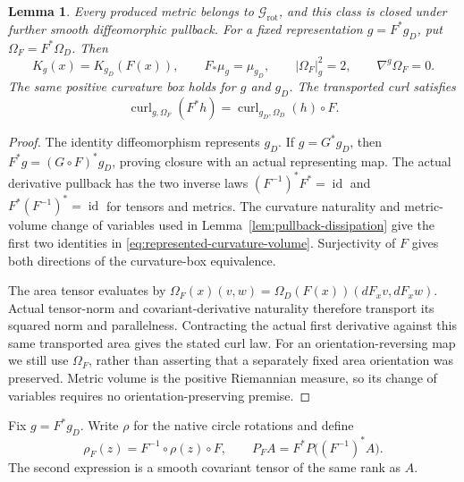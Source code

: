 \documentclass[11pt]{article}
\newtheorem{lemma}[theorem]{Lemma}
\begin{document}
\begin{lemma}\label{lem:represented-metric-naturality}
Every produced metric belongs to $\mathcal G_{\mathrm{rot}}$, and this
class is closed under further smooth diffeomorphic pullback.
For a fixed representation $g=F^*g_D$, put $\Omega_F=F^*\Omega_D$. Then
\begin{equation}\label{eq:represented-curvature-volume}
 K_g(x)=K_{g_D}(F(x)),\qquad
 F_*\mu_g=\mu_{g_D},\qquad
 |\Omega_F|_g^2=2,\qquad \nabla^g\Omega_F=0 .
\end{equation}
The same positive curvature box holds for $g$ and $g_D$. The transported
curl satisfies
\[
 \operatorname{curl}_{g,\Omega_F}(F^*h)
 =\operatorname{curl}_{g_D,\Omega_D}(h)\circ F.
\]
\end{lemma}

\begin{proof}
The identity diffeomorphism represents $g_D$. If $g=G^*g_D$, then
$F^*g=(G\circ F)^*g_D$, proving closure with an actual representing map.
The actual derivative pullback has the two inverse laws
$(F^{-1})^*F^*=\operatorname{id}$ and
$F^*(F^{-1})^*=\operatorname{id}$ for tensors and metrics.
The curvature naturality and metric-volume change of variables used in
Lemma~\ref{lem:pullback-dissipation} give the first two identities in
\eqref{eq:represented-curvature-volume}. Surjectivity of $F$ gives both
directions of the curvature-box equivalence.

The area tensor evaluates by
$\Omega_F(x)(v,w)=\Omega_D(F(x))(dF_xv,dF_xw)$.
Actual tensor-norm and covariant-derivative naturality therefore transport
its squared norm and parallelness. Contracting the actual first derivative
against this same transported area gives the stated curl law.
For an orientation-reversing map we still use $\Omega_F$, rather than
asserting that a separately fixed area orientation was preserved.
Metric volume is the positive Riemannian measure, so its change of variables
requires no orientation-preserving premise.
\end{proof}

Fix $g=F^*g_D$. Write $\rho$ for the native circle rotations and define
\begin{equation}\label{eq:conjugated-action-projector}
 \rho_F(z)=F^{-1}\circ\rho(z)\circ F,\qquad
 P_F A=F^*P\bigl((F^{-1})^*A\bigr).
\end{equation}
The second expression is a smooth covariant tensor of the same rank as $A$.
\end{document}
